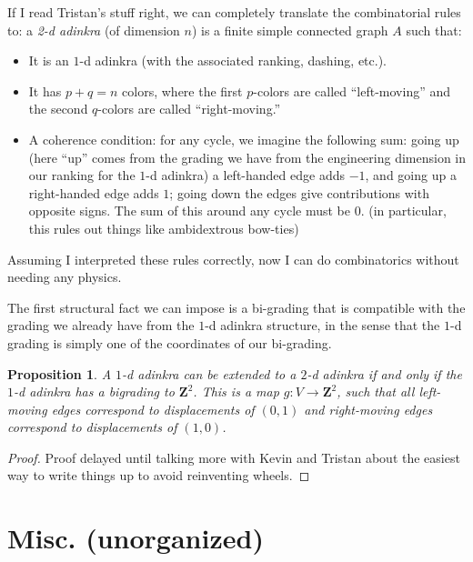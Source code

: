 \documentclass[12pt,twoside,singlespace]{article}
\numberwithin{equation}{section}
\newtheorem{prop}[equation]{Proposition}
\theoremstyle{definition}
\newcommand{\ZZ}{\mathbf{Z}}
\begin{document}
If I read Tristan's stuff right, we can completely translate the combinatorial rules to: a \emph{2-d adinkra} (of dimension $n$) is a finite simple connected graph $A$ such that:
\begin{itemize}
\item It is an $1$-d adinkra (with the associated ranking, dashing, etc.).
\item It has $p + q = n$ colors, where the first $p$-colors are called ``left-moving'' and the second $q$-colors are called ``right-moving.''
\item A coherence condition: for any cycle, we imagine the following sum: going up (here ``up'' comes from the grading we have from the engineering dimension in our ranking for the $1$-d adinkra) a left-handed edge adds $-1$, and going up a right-handed edge adds $1$; going down the edges give contributions with opposite signs. The sum of this around any cycle must be $0$. (in particular, this rules out things like ambidextrous bow-ties)
\end{itemize} 

Assuming I interpreted these rules correctly, now I can do combinatorics without needing any physics.


The first structural fact we can impose is a bi-grading that is compatible with the grading we already have from the $1$-d adinkra structure, in the sense that the $1$-d grading is simply one of the coordinates of our bi-grading.

\begin{prop}
A $1$-d adinkra can be extended to a $2$-d adinkra if and only if the $1$-d adinkra has a \emph{bigrading} to $\ZZ^2$. This is a map $g: V \rightarrow \ZZ^2$, such that all left-moving edges correspond to displacements of $(0, 1)$ and right-moving edges correspond to displacements of $(1, 0)$.
\end{prop}

\begin{proof}
Proof delayed until talking more with Kevin and Tristan about the easiest way to write things up to avoid reinventing wheels.
\end{proof}

\section{Misc. (unorganized)}
\end{document}

